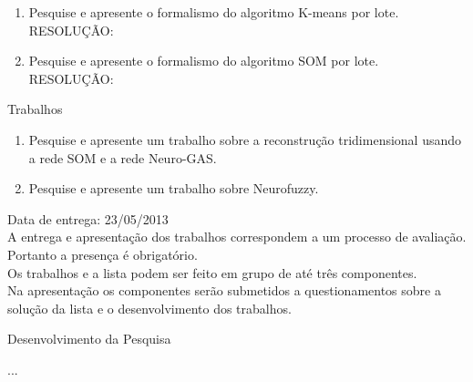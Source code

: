 \documentclass[a4paper,oneside,12pt]{article}
\begin{document}
\begin{enumerate}[1.]
\newpage

\item Pesquise e apresente o formalismo do algoritmo K-means por lote. \\ 

RESOLU\c{C}\~AO: \\

\item Pesquise e apresente o formalismo do algoritmo SOM por lote. \\

RESOLU\c{C}\~AO: \\


\end{enumerate}

\newpage

\begin{center}
Trabalhos
\end{center}

\begin{enumerate}[1.]
\item Pesquise e apresente um trabalho sobre a reconstru\c{c}\~ao tridimensional usando a rede SOM e a rede Neuro-GAS. \\

\item Pesquise e apresente um trabalho sobre Neurofuzzy.
\end{enumerate}

Data de entrega: 23/05/2013 \\

A entrega e apresenta\c{c}\~ao dos trabalhos correspondem a um processo de avalia\c{c}\~ao. Portanto a presen\c{c}a \'e obrigat\'orio. \\

Os trabalhos e a lista podem ser feito em grupo de at\'e tr\^es componentes. \\

Na apresenta\c{c}\~ao os componentes ser\~ao submetidos a questionamentos sobre a solu\c{c}\~ao da lista e o desenvolvimento dos trabalhos. \\

\newpage

\begin{center}
Desenvolvimento da Pesquisa
\end{center}

...
\end{document}
